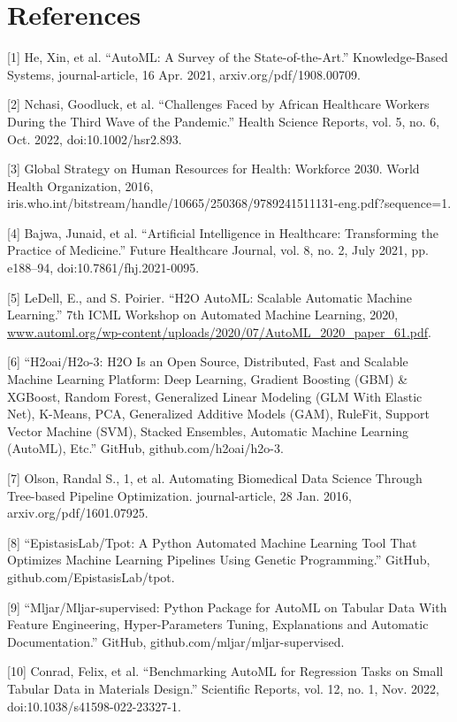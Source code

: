 \documentclass{article}
\begin{document}
\section*{References}
\medskip
{
\small

[1] He, Xin, et al. “AutoML: A Survey of the State-of-the-Art.” Knowledge-Based Systems, journal-article, 16 Apr. 2021, arxiv.org/pdf/1908.00709.

[2] Nchasi, Goodluck, et al. “Challenges Faced by African Healthcare Workers During the Third Wave of the Pandemic.” Health Science Reports, vol. 5, no. 6, Oct. 2022, doi:10.1002/hsr2.893.

[3] Global Strategy on Human Resources for Health: Workforce 2030. World Health Organization, 2016, iris.who.int/bitstream/handle/10665/250368/9789241511131-eng.pdf?sequence=1.

[4] Bajwa, Junaid, et al. “Artificial Intelligence in Healthcare: Transforming the Practice of Medicine.” Future Healthcare Journal, vol. 8, no. 2, July 2021, pp. e188–94, doi:10.7861/fhj.2021-0095.

[5] LeDell, E., and S. Poirier. “H2O AutoML: Scalable Automatic Machine Learning.” 7th ICML Workshop on Automated Machine Learning, 2020, \url{www.automl.org/wp-content/uploads/2020/07/AutoML_2020_paper_61.pdf}.

[6] “H2oai/H2o-3: H2O Is an Open Source, Distributed, Fast and Scalable Machine Learning Platform: Deep Learning, Gradient Boosting (GBM) \& XGBoost, Random Forest, Generalized Linear Modeling (GLM With Elastic Net), K-Means, PCA, Generalized Additive Models (GAM), RuleFit, Support Vector Machine (SVM), Stacked Ensembles, Automatic Machine Learning (AutoML), Etc.” GitHub, github.com/h2oai/h2o-3.

[7] Olson, Randal S., 1, et al. Automating Biomedical Data Science Through Tree-based Pipeline Optimization. journal-article, 28 Jan. 2016, arxiv.org/pdf/1601.07925.

[8] “EpistasisLab/Tpot: A Python Automated Machine Learning Tool That Optimizes Machine Learning Pipelines Using Genetic Programming.” GitHub, github.com/EpistasisLab/tpot.

[9] “Mljar/Mljar-supervised: Python Package for AutoML on Tabular Data With Feature Engineering, Hyper-Parameters Tuning, Explanations and Automatic Documentation.” GitHub, github.com/mljar/mljar-supervised.

[10] Conrad, Felix, et al. “Benchmarking AutoML for Regression Tasks on Small Tabular Data in Materials Design.” Scientific Reports, vol. 12, no. 1, Nov. 2022, doi:10.1038/s41598-022-23327-1.

}
\end{document}
